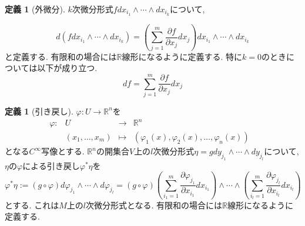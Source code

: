 \documentclass[dvipdfmx,a4paper,11pt]{article}
\newcommand{\R}{\mathbb{R}}
\theoremstyle{definition}
\newtheorem{dfn}[thm]{定義}
\newcommand{\pdrv}[2]{\frac{\partial #1}{\partial #2}}
\begin{document}
  \begin{tcolorbox}[
    colback = white,
    colframe = green!35!black,
    fonttitle = \bfseries,
    breakable = true]
\begin{dfn}[外微分]
$k$次微分形式$f d x_{i_1}\wedge \cdots \wedge dx_{i_k}$について, 

$$
d \left(  f d x_{i_1}\wedge \cdots \wedge dx_{i_k} \right)
= \left(\sum_{j=1}^{m}\pdrv{f}{x_{j}}d x_{j}\right)  d x_{i_1}\wedge \cdots \wedge dx_{i_k}
$$
と定義する. 有限和の場合には$\R$線形になるように定義する. 特に$k=0$のときについては以下が成り立つ. 
$$
df =  \sum_{j=1}^{m}\pdrv{f}{x_{j}}d x_{j}
$$
    \end{dfn}
    \end{tcolorbox}
      \begin{tcolorbox}[
    colback = white,
    colframe = green!35!black,
    fonttitle = \bfseries,
    breakable = true]
\begin{dfn}[引き戻し]


 $\varphi : U \rightarrow \R^n$を
 $$
 \begin{array}{ccccc}
\varphi: &U& \rightarrow & \R^n& \\
&(x_{1}, \ldots, x_m) & \longmapsto & 
(\varphi_1 (x) , \varphi_2 (x) , \ldots, \varphi_n (x)) &
\end{array}
$$
 となる$C^{\infty}$写像とする.
 $\R^n$の開集合$V$上の$l$次微分形式$\eta = g d y_{j_1} \wedge \cdots \wedge dy_{j_l}$について, $\eta$の$\varphi$による引き戻し$\varphi^{*}\eta$を
 $$
\varphi^{*}\eta:= 
(g\circ \varphi )d \varphi_{j_1} \wedge \cdots \wedge d \varphi_{j_l} 
=
(g\circ \varphi )
\left(\sum_{i_1 =1}^{m}\pdrv{ \varphi_{j_1}}{x_{i_1}} dx_{i_1} \right)\wedge \cdots \wedge 
\left(\sum_{i_l =1}^{m}\pdrv{\varphi_{j_l}}{x_{i_l}} dx_{i_l}\right)
$$
とする. これは$M$上の$l$次微分形式となる. 有限和の場合には$\R$線形になるように定義する. 

    \end{dfn}
    \end{tcolorbox}
 
\end{document}
